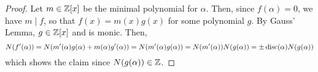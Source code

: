 \begin{proof} 
    Let $m \in \mathbb{Z}[x]$ be the minimal polynomial for $\alpha$. Then, since $f(\alpha) = 0$, we have $m \mid f$, so that $f(x) = m(x)g(x)$ for some polynomial $g$. By Gauss' Lemma, $g \in \mathbb{Z}[x]$ and is monic. Then,
    \[ N(f'(\alpha)) = N(m'(\alpha)g(\alpha)+m(\alpha)g'(\alpha)) = N(m'(\alpha)g(\alpha)) = N(m'(\alpha))N(g(\alpha)) = \pm \operatorname{disc}(\alpha)N(g(\alpha)) \]
    which shows the claim since $N(g(\alpha)) \in \mathbb{Z}$.
\end{proof}
